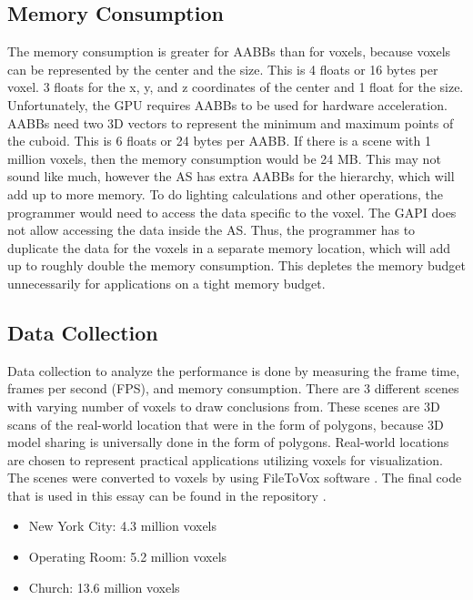 \documentclass[12pt]{article}
\begin{document}
\subsection{Memory Consumption}

The memory consumption is greater for AABBs than for voxels, because voxels can be represented by the center and the size.
This is 4 floats or 16 bytes per voxel. 3 floats for the x, y, and z coordinates of the center and 1 float for the size.
Unfortunately, the GPU requires AABBs to be used for hardware acceleration.
AABBs need two 3D vectors to represent the minimum and maximum points of the cuboid.
This is 6 floats or 24 bytes per AABB.
If there is a scene with 1 million voxels, then the memory consumption would be 24 MB.
This may not sound like much, however the AS has extra AABBs for the hierarchy, which will add up to more memory.
To do lighting calculations and other operations, the programmer would need to access the data specific to the voxel.
The GAPI does not allow accessing the data inside the AS. Thus, the programmer has to duplicate the data for the voxels in a separate
memory location, which will add up to roughly double the memory consumption.
This depletes the memory budget unnecessarily for applications on a tight memory budget.

\subsection{Data Collection}

Data collection to analyze the performance is done by measuring the frame time, frames per second (FPS), and memory consumption.
There are 3 different scenes with varying number of voxels to draw conclusions from.
These scenes are 3D scans of the real-world location that were in the form of polygons, because 3D model sharing
is universally done in the form of polygons. Real-world locations are chosen to represent practical applications utilizing
voxels for visualization. The scenes were converted to voxels by using FileToVox software \parencite{Github:FileToVox}.
The final code that is used in this essay can be found in the repository  \parencite{Github:FastVoxels}.

\begin{itemize}
    \itemsep0em
    \item New York City: 4.3 million voxels \parencite{SketchFab:NewYorkCity}
    \item Operating Room: 5.2 million voxels \parencite{SketchFab:OperatingRoom}
    \item Church: 13.6 million voxels \parencite{SketchFab:Church}
\end{itemize}
\end{document}
